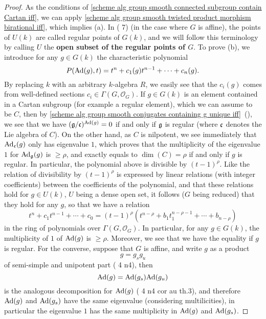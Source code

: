 \begin{proof}
As the conditions of \cref{scheme alg group smooth connected subgroup contain Cartan iff}, we can apply \cref{scheme alg group smooth twisted product morphism birational iff}, which implies (a). In (\cite{Chevalley1958} 7) (in the case where $G$ is affine), the points of $U(k)$ are called regular points of $G(k)$, and we will follow this terminology by calling $U$ the \textbf{open subset of the regular points of $G$}. To prove (b), we introduce for any $g\in G(k)$ the characteristic polynomial
\[P(\mathrm{Ad}(g),t)=t^n+c_1(g)t^{n-1}+\cdots+c_n(g).\]
By replacing $k$ with an arbitrary $k$-algebra $R$, we easily see that the $c_i(g)$ comes from well-defined sections $c_i\in\Gamma(G,\mathscr{O}_G)$. If $g\in G(k)$ is an element contained in a Cartan subgroup (for example a regular element), which we can assume to be $C$, then by \cref{scheme alg group smooth conjugates containing g unique iff}~(), we see that we have $(\mathfrak{g}/\mathfrak{c})^{\mathrm{Ad}(g)}=0$ if and only if $\mathfrak{g}$ is regular (where $\mathfrak{c}$ denotes the Lie algebra of $C$). On the other hand, as $C$ is nilpotent, we see immediately that $\mathrm{Ad}_{\mathfrak{c}}(g)$ only has eigenvalue $1$, which proves that the multiplicity of the eigenvalue $1$ for $\mathrm{Ad}_{\mathfrak{g}}(g)$ is $\geq\rho$, and exactly equals to $\dim(C)=\rho$ if and only if $g$ is regular. In particular, the polynomial above is divisible by $(t-1)^\rho$. Like the relation of divisibility by $(t-1)^\rho$ is expressed by linear relations (with integer coefficients) between the coefficients of the polynomial, and that these relations hold for $g\in U(k)$, $U$ being a dense open set, it follows ($G$ being reduced) that they hold for any $g$, so that we have a relation
\begin{equation}\label{scheme alg group smooth twisted product morphism for Cartan group and eigenvalue of 1-1}
t^n+c_1t^{n-1}+\cdots+c_0=(t-1)^\rho(t^{n-\rho}+b_1t_1^{n-\rho-1}+\cdots+b_{n-\rho})
\end{equation}
in the ring of polynomials over $\Gamma(G,\mathscr{O}_G)$. In particular, for any $g\in G(k)$, the multiplicity of $1$ of $\mathrm{Ad}(g)$ is $\geq\rho$. Moreover, we see that we have the equality if $g$ is regular. For the converse, suppose that $G$ is affine, and write $g$ as a product
\[g=g_sg_u\]
of semi-simple and unipotent part (\cite{Chevalley1958} 4 n4), then
\[\mathrm{Ad}(g)=\mathrm{Ad}(g_s)\mathrm{Ad}(g_u)\]
is the analogous decomposition for $\mathrm{Ad}(g)$ (\cite{Chevalley1958} 4 n4 cor au th.3), and therefore $\mathrm{Ad}(g)$ and $\mathrm{Ad}(g_s)$ have the same eigenvalue (considering multilicities), in particular the eigenvalue $1$ has the same multiplicity in $\mathrm{Ad}(g)$ and $\mathrm{Ad}(g_s)$.\par

\end{proof}
